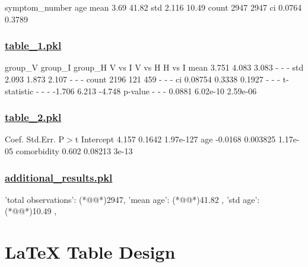 \documentclass[11pt]{article}
\begin{document}
\begin{codeoutput}
       symptom\_number    age
mean             3.69  41.82
std             2.116  10.49
count            2947   2947
ci             0.0764 0.3789
\end{codeoutput}\hypertarget{file-table-1-pkl}{}

\subsubsection*{\hyperlink{code-Data Analysis-table-1-pkl}{table\_1.pkl}}

\begin{codeoutput}
            group\_V group\_I group\_H  V vs I    V vs H    H vs I
mean          3.751   4.083   3.083       -         -         -
std           2.093   1.873   2.107       -         -         -
count          2196     121     459       -         -         -
ci          0.08754  0.3338  0.1927       -         -         -
t-statistic       -       -       -  -1.706     6.213    -4.748
p-value           -       -       -  0.0881  6.02e-10  2.59e-06
\end{codeoutput}\hypertarget{file-table-2-pkl}{}

\subsubsection*{\hyperlink{code-Data Analysis-table-2-pkl}{table\_2.pkl}}

\begin{codeoutput}
              Coef.  Std.Err.      P$>$\textbar{}t\textbar{}
Intercept     4.157    0.1642  1.97e-127
age         -0.0168  0.003825   1.17e-05
comorbidity   0.602   0.08213      3e-13
\end{codeoutput}\hypertarget{file-additional-results-pkl}{}

\subsubsection*{\hyperlink{code-Data Analysis-additional-results-pkl}{additional\_results.pkl}}

\begin{codeoutput}
{
    'total observations': (*@@*)2947,
    'mean age': (*@@*)41.82             ,
    'std age': (*@@*)10.49             ,
}
\end{codeoutput}

\section{LaTeX Table Design}
\end{document}
